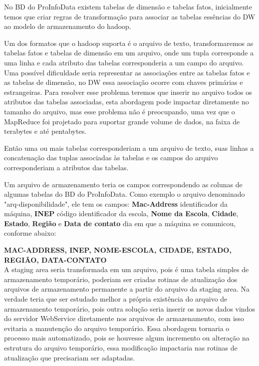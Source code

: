 \documentclass[a4paper,12pt]{article}
\begin{document}
No BD do ProInfoData existem tabelas de dimensão e tabelas fatos, inicialmente
temos que criar regras de transformação para associar as tabelas essências do
DW ao modelo de armazenamento do hadoop.

Um dos formatos que o hadoop suporta é o arquivo de texto, transformaremos as
tabelas fatos e tabelas de dimensão em um arquivo, onde um tupla corresponde a
uma linha e cada atributo das tabelas corresponderia a um campo do arquivo. Uma
possível dificuldade seria representar as associações entre as tabelas fatos e
as tabelas de dimensão, no DW essa associação ocorre com chaves primárias e
estrangeiras. Para resolver esse problema teremos que inserir no arquivo todos
os atributos das tabelas associadas, esta abordagem pode impactar diretamente no
tamanho do arquivo, mas esse problema não é preocupando, uma vez que o MapReduce
foi projetado para suportar grande volume de dados, na faixa de terabytes e até
pentabytes.

Então uma ou mais tabelas corresponderiam a um arquivo de texto, suas linhas a
concatenação das tuplas associadas às tabelas e os campos do arquivo
corresponderiam a atributos das tabelas.

Um arquivo de armazenamento teria os campos correspondendo as colunas de
algumas tabelas do BD do ProInfoData. Como exemplo o arquivo denominado
"arq-disponibilidade", ele tem os campos: \textbf{Mac-Address} identificador
da máquina, \textbf{INEP} código identificador da escola, \textbf{Nome da Escola},
\textbf{Cidade}, \textbf{Estado}, \textbf{Região} e \textbf{Data de contato} dia em
que a máquina se comunicou, conforme abaixo:

\textbf{MAC-ADDRESS, INEP, NOME-ESCOLA, CIDADE, ESTADO, REGIÃO, DATA-CONTATO}\\

A staging area seria transformada em um arquivo, pois é uma tabela simples de
armazenamento temporário, poderiam ser criadas rotinas de atualização dos
arquivos de armazenamento permanente a partir do arquivo da staging area. Na
verdade teria que ser estudado melhor a própria existência do arquivo de
armazenamento temporário, pois outra solução seria inserir os novos dados vindos
do servidor WebService diretamente nos arquivos de armazenamento, com isso
evitaria a manutenção do arquivo temporário. Essa abordagem tornaria o processo
mais automatizado, pois se houvesse algum incremento ou alteração na
estrutura do arquivo temporário, essa modificação impactaria nas rotinas de
atualização que precisariam ser adaptadas.
 
\end{document}
